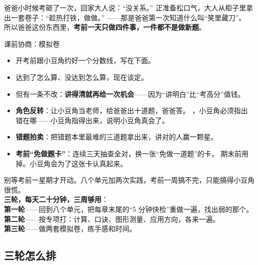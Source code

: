 
\begin{blunder}
爸爸小时候考砸了一次，回家大人说：“没关系。”
正准备松口气，大人从柜子里拿出一套卷子：“趁热打铁，做做。”
——那是爸爸第一次知道什么叫“笑里藏刀”。
所以爸爸这份东西里，\textbf{考前一天只做四件事，一件都不是做新题}。
\end{blunder}

\begin{gamble}{课前协商：模拟卷}
\begin{itemize}
  \item 开考前跟小豆角约好一个分数线，写在下面。
  \item 达到了怎么算、没达到怎么算，现在谈定。
  \item 但有一条不改：\textbf{讲得清就再给一次机会}——因为“讲明白”比“考高分”值钱。
\end{itemize}
\negolines
\end{gamble}

\begin{bonus}
\begin{itemize}
  \item \textbf{角色反转}：让小豆角当老师，给爸爸出十道题，爸爸答。
        ，小豆角必须指出错在哪——小豆角指得出来，说明小豆角真会了。
  \item \textbf{错题拍卖}：把错题本里最难的三道题拿出来，讲对的人赢一颗星。
  \item \textbf{考前“免做题卡”}：连续三天抽查全对，换一张“免做一道题”的卡，
        期末前用掉。小豆角会为了这张卡认真起来。
\end{itemize}
\end{bonus}

\begin{unitinfo}
别等考前一星期才开动。八个单元加两次实践，考前一周搞不完，只能搞得小豆角很慌。\\
\textbf{三轮，每天二十分钟，三周够用}：\\
\textbf{第一轮}——回到八个单元，把每章末尾的“5 分钟快检”重做一遍，找出弱的那个。\\
\textbf{第二轮}——按专项打：计算、口诀、图形测量、应用方向，各来一遍。\\
\textbf{第三轮}——做两套模拟卷，练手感和时间。
\end{unitinfo}

\subsection{三轮怎么排}

